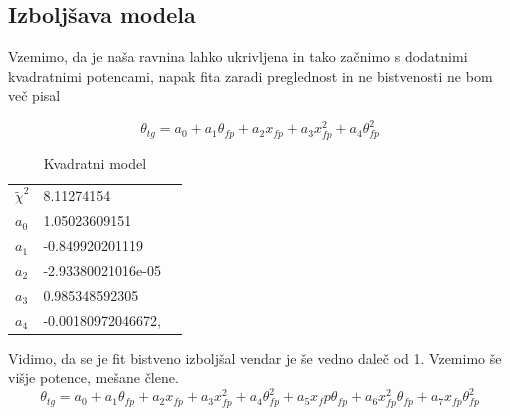\documentclass[11pt, a4paper]{article}
\begin{document}
\subsection{Izboljšava modela}
Vzemimo, da je naša ravnina lahko ukrivljena in tako začnimo s dodatnimi kvadratnimi potencami, napak fita zaradi preglednost in ne bistvenosti ne bom več pisal

\begin{equation}
\theta_{tg} = a_0 + a_1 \theta_{fp} + a_2 x_{fp} + a_3 x_{fp}^2 + a_4 \theta_{fp}^2
\end{equation}

\begin{table}[H]
\centering
\caption{Kvadratni model}
\label{my-label}
\begin{tabular}{lll}
	$\widetilde{\chi}^2$ &8.11274154
&  \\
 $a_0$ & 1.05023609151 \\
 $a_1$ &  -0.849920201119   \\
 $a_2$ &  -2.93380021016e-05  \\
 $a_3$ &   0.985348592305 \\
 $a_4$ & -0.00180972046672,
\end{tabular}
\end{table}
Vidimo, da se je fit bistveno izboljšal vendar je še vedno daleč od 1.\newline\newline
Vzemimo še višje potence, mešane člene.
\begin{equation}
\theta_{tg} = a_0 + a_1 \theta_{fp} + a_2 x_{fp} + a_3 x_{fp}^2 + a_4 \theta_{fp}^2 +a_5  x_fp\theta_{fp} + a_6 x_{fp}^2\theta_{fp}+ a_7 x_{fp}\theta_{fp}^2
\end{equation}
\end{document}
